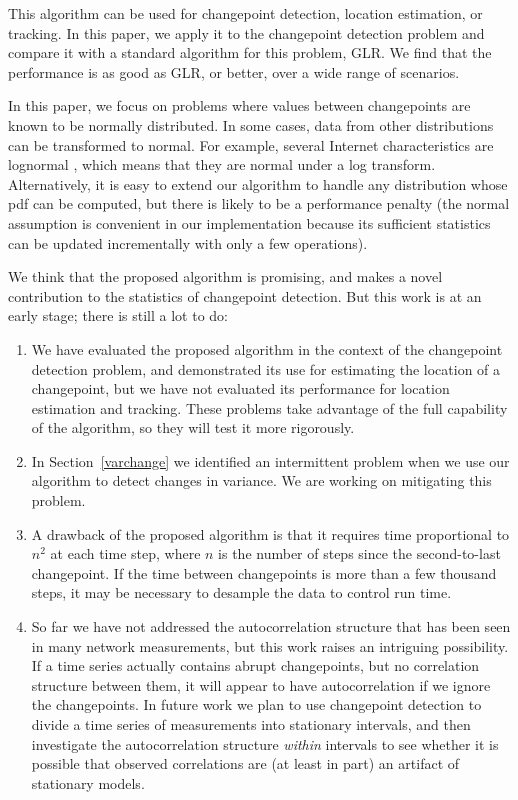 \documentclass[twocolumn,11pt]{article}
\begin{document}
This algorithm can be used for changepoint detection, location
estimation, or tracking.  In this paper, we apply it to the
changepoint detection problem and compare it with a standard algorithm
for this problem, GLR.  We find that the performance is as good as
GLR, or better, over a wide range of scenarios.

In this paper, we focus on problems where values between changepoints
are known to be normally distributed.  In some cases, data from other
distributions can be transformed to normal.  For example, several
Internet characteristics are lognormal
\cite{paxson94empirically}, which means that they are normal under a
log transform.  Alternatively, it is easy to extend our algorithm to
handle any distribution whose pdf can be computed, but there is
likely to be a performance penalty (the normal assumption is
convenient in our implementation because its sufficient statistics can
be updated incrementally with only a few operations).

We think that the proposed algorithm is promising, and makes a novel
contribution to the statistics of changepoint detection.
But this work is at an early stage; there is still a lot to do:

\begin{enumerate}

\item We have evaluated the proposed algorithm in the context of the
changepoint detection problem, and demonstrated its use for estimating
the location of a changepoint, but we have not evaluated its
performance for location estimation and tracking.  These problems take
advantage of the full capability of the algorithm, so they will test
it more rigorously.

\item In Section~\ref{varchange} we identified an intermittent problem
when we use our algorithm to detect changes in variance.  We are
working on mitigating this problem.

\item A drawback of the proposed algorithm is that it requires
time proportional to $n^2$ at each time step, where $n$ is the number
of steps since the second-to-last changepoint.  If the time between
changepoints is more than a few thousand steps, it may be necessary
to desample the data to control run time.

\item So far we have not addressed the autocorrelation structure that
has been seen in many network measurements, but this work raises an
intriguing possibility.  If a time series actually contains abrupt
changepoints, but no correlation structure between them, it
will appear to have autocorrelation if we ignore the changepoints.
In future work we plan to use changepoint detection to divide a time
series of measurements into stationary intervals, and then investigate
the autocorrelation structure {\em within} intervals to see whether
it is possible that observed correlations are (at least in part) an
artifact of stationary models.

\end{enumerate}



\end{document}
